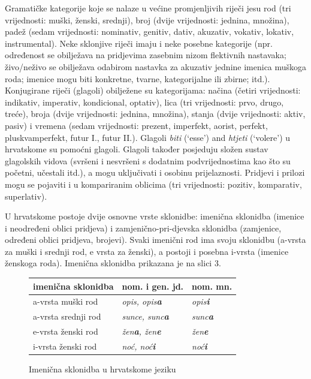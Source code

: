 \begin{multicols}{2}
Gramatičke kategorije koje se nalaze u većine promjenljivih riječi jesu rod (tri vrijednosti: muški, ženski, srednji), broj (dvije vrijednosti: jednina, množina), padež (sedam vrijednosti: nominativ, genitiv, dativ, akuzativ, vokativ, lokativ, instrumental). Neke sklonjive riječi imaju i neke posebne kategorije (npr. određenost se obilježava na pridjevima zasebnim nizom flektivnih nastavaka; živo/neživo se obilježava odabirom nastavka za akuzativ jednine imenica muškoga roda; imenice mogu biti konkretne, tvarne, kategorijalne ili zbirne; itd.). Konjugirane riječi (glagoli) obilježene su kategorijama: načina (četiri vrijednosti: indikativ, imperativ, kondicional, optativ), lica (tri vrijednosti: prvo, drugo, treće), broja (dvije vrijednosti: jednina, množina), stanja (dvije vrijednosti: aktiv, pasiv) i vremena (sedam vrijednosti: prezent, imperfekt, aorist, perfekt, pluskvamperfekt, futur I., futur II.). Glagoli \emph{biti} (‘esse’) and \emph{htjeti} (‘volere’) u hrvatskome su pomoćni glagoli. Glagoli također posjeduju složen sustav glagolskih vidova (svršeni i nesvršeni s dodatnim podvrijednostima kao što su početni, učestali itd.), a mogu uključivati i osobinu prijelaznosti. Pridjevi i prilozi mogu se pojaviti i u kompariranim oblicima (tri vrijednosti: pozitiv, komparativ, superlativ).

U hrvatskome postoje dvije osnovne vrste sklonidbe: imenična sklonidba (imenice i neodređeni oblici pridjeva) i zamjenično-pri-djevska sklonidba (zamjenice, određeni oblici pridjeva, brojevi). Svaki imenični rod ima svoju sklonidbu (a-vrsta za muški i srednji rod, e vrsta za ženski), a postoji i posebna i-vrsta (imenice ženskoga roda). Imenična sklonidba prikazana je na slici 3. 

\begin{figure}[htb]
\centering
	\begin{tabular}{ |l|l|l| }
  \hline
  \textbf{imenična sklonidba} & \textbf{nom. i gen. jd.} & \textbf{nom. mn.}  \\ 
  \hline \hline
  a-vrsta muški rod   & \emph{opis, opis\textbf{a}}     &  \emph{opis\textbf{i}} \\ 
  \hline
  a-vrsta srednji rod   & \emph{sunce, sunc\textbf{a}}     &  \emph{sunc\textbf{a}} \\ 
  \hline
  e-vrsta ženski rod   & \emph{žen\textbf{a}, žen\textbf{e}}     &  \emph{žen\textbf{e}} \\
  \hline
  i-vrsta ženski rod   & \emph{noć, noć\textbf{i}}     &  \emph{noć\textbf{i}} \\
  \hline
  \end{tabular}
  \caption{Imenična sklonidba u hrvatskome jeziku}
  \label{fig:imenicka}
\end{figure}


\end{multicols}
